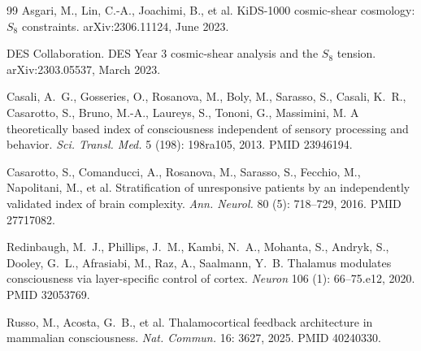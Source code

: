 \documentclass[11pt,a4paper]{amsart}
\theoremstyle{plain}
\theoremstyle{definition}
\begin{document}
\begin{thebibliography}{99}
Asgari, M., Lin, C.-A., Joachimi, B., et al.
\newblock KiDS-1000 cosmic-shear cosmology: $S_8$ constraints.
\newblock arXiv:2306.11124, June 2023.

DES Collaboration.
\newblock DES Year 3 cosmic-shear analysis and the $S_8$ tension.
\newblock arXiv:2303.05537, March 2023.

Casali, A.~G., Gosseries, O., Rosanova, M., Boly, M., Sarasso, S., Casali, K.~R., Casarotto, S., Bruno, M.-A., Laureys, S., Tononi, G., Massimini, M.
\newblock A theoretically based index of consciousness independent of sensory processing and behavior.
\newblock \emph{Sci. Transl. Med.} 5 (198): 198ra105, 2013. PMID 23946194.

Casarotto, S., Comanducci, A., Rosanova, M., Sarasso, S., Fecchio, M., Napolitani, M., et al.
\newblock Stratification of unresponsive patients by an independently validated index of brain complexity.
\newblock \emph{Ann. Neurol.} 80 (5): 718--729, 2016. PMID 27717082.

Redinbaugh, M.~J., Phillips, J.~M., Kambi, N.~A., Mohanta, S., Andryk, S., Dooley, G.~L., Afrasiabi, M., Raz, A., Saalmann, Y.~B.
\newblock Thalamus modulates consciousness via layer-specific control of cortex.
\newblock \emph{Neuron} 106 (1): 66--75.e12, 2020. PMID 32053769.

Russo, M., Acosta, G.~B., et al.
\newblock Thalamocortical feedback architecture in mammalian consciousness.
\newblock \emph{Nat. Commun.} 16: 3627, 2025. PMID 40240330.

\end{thebibliography}
\end{document}
